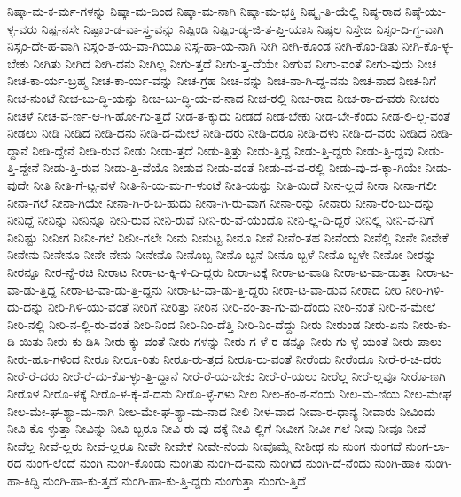 {ನಿಷ್ಕಾ-ಮ-ಕ-ರ್ಮ-ಗಳನ್ನು
ನಿಷ್ಕಾ-ಮ-ದಿಂದ
ನಿಷ್ಕಾ-ಮ-ನಾಗಿ
ನಿಷ್ಕಾ-ಮ-ಭಕ್ತಿ
ನಿಷ್ಕೃ-ತಿ-ಯೆಲ್ಲಿ
ನಿಷ್ಠ-ರಾದ
ನಿಷ್ಠೆ-ಯು-ಳ್ಳ-ವರು
ನಿಷ್ಪ-ನಸೇ
ನಿಷ್ಪಾಂ-ಡ-ವಾ-ಸ್ತ್ರ-ವನ್ನು
ನಿಷ್ಪಿಂಡಿ
ನಿಷ್ಪಿಂ-ಡ್ಯ-ಜಿ-ತ-ಪ್ತಿ-ಯಾಸಿ
ನಿಷ್ಫಲ
ನಿಸ್ತೇಜ
ನಿಸ್ಸಂ-ದಿ-ಗ್ಧ-ವಾಗಿ
ನಿಸ್ಸಂ-ದೇ-ಹ-ವಾಗಿ
ನಿಸ್ಸಂ-ಶ-ಯ-ವಾ-ಗಿಯೂ
ನಿಸ್ಸ-ಹಾ-ಯ-ನಾಗಿ
ನೀಗಿ
ನೀಗಿ-ಕೊಂಡ
ನೀಗಿ-ಕೊಂ-ಡಿತು
ನೀಗಿ-ಕೊ-ಳ್ಳ-ಬೇಕು
ನೀಗಿತು
ನೀಗಿದ
ನೀಗಿ-ದನು
ನೀಗಿಲ್ಲ
ನೀಗು-ತ್ತದೆ
ನೀಗು-ತ್ತ-ದೆಯೇ
ನೀಗುವ
ನೀಗು-ವಂತೆ
ನೀಗು-ವುದು
ನೀಚ
ನೀಚ-ಕಾ-ರ್ಯ-ಬ್ರಹ್ಮ
ನೀಚ-ಕಾ-ರ್ಯ-ವನ್ನು
ನೀಚ-ಗ್ರಹ
ನೀಚ-ನನ್ನು
ನೀಚ-ನಾ-ಗಿ-ದ್ದ-ವನು
ನೀಚ-ನಾದ
ನೀಚ-ನಿಗೆ
ನೀಚ-ನುಂಟೆ
ನೀಚ-ಬು-ದ್ಧಿ-ಯನ್ನು
ನೀಚ-ಬು-ದ್ಧಿ-ಯ-ವ-ನಾದ
ನೀಚ-ರಲ್ಲಿ
ನೀಚ-ರಾದ
ನೀಚ-ರಾ-ದ-ವರು
ನೀಚರು
ನೀಚಳೆ
ನೀಚ-ವ-ರ್ಣ-ಆ-ಗಿ-ಹೋ-ಗು-ತ್ತದೆ
ನೀಡ-ತ-ಕ್ಕುದು
ನೀಡದೆ
ನೀಡ-ಬೇಕು
ನೀಡ-ಬೇ-ಕೆಂದು
ನೀಡ-ಲಿ-ಲ್ಲ-ವಂತೆ
ನೀಡಲು
ನೀಡಿ
ನೀಡಿದ
ನೀಡಿ-ದನು
ನೀಡಿ-ದ-ಮೇಲೆ
ನೀಡಿ-ದರು
ನೀಡಿ-ದರೂ
ನೀಡಿ-ದಳು
ನೀಡಿ-ದ-ವರು
ನೀಡಿದೆ
ನೀಡಿ-ದ್ದಾನೆ
ನೀಡಿ-ದ್ದೇನೆ
ನೀಡಿ-ರುವ
ನೀಡು
ನೀಡು-ತ್ತದೆ
ನೀಡು-ತ್ತಿತ್ತು
ನೀಡು-ತ್ತಿದ್ದ
ನೀಡು-ತ್ತಿ-ದ್ದರು
ನೀಡು-ತ್ತಿ-ದ್ದವು
ನೀಡು-ತ್ತಿ-ದ್ದೇನೆ
ನೀಡು-ತ್ತಿ-ರುವ
ನೀಡು-ತ್ತಿ-ವೆಯೊ
ನೀಡುವ
ನೀಡು-ವಂತೆ
ನೀಡು-ವ-ವ-ರಲ್ಲಿ
ನೀಡು-ವು-ದ-ಕ್ಕಾ-ಗಿಯೇ
ನೀಡು-ವುದೇ
ನೀತಿ
ನೀತಿ-ಗೆ-ಟ್ಟ-ವಳೆ
ನೀತಿ-ನಿ-ಯ-ಮ-ಗ-ಳುಂಟೆ
ನೀತಿ-ಯನ್ನು
ನೀತಿ-ಯಿದೆ
ನೀನ-ಲ್ಲದೆ
ನೀನಾ
ನೀನಾ-ಗಲೀ
ನೀನಾ-ಗಲೆ
ನೀನಾ-ಗಿಯೇ
ನೀನಾ-ಗಿ-ರ-ಬ-ಹುದು
ನೀನಾ-ಗಿ-ರು-ವಾಗ
ನೀನಾ-ರನ್ನು
ನೀನಾರು
ನೀನಾ-ರೆಂ-ಬು-ದನ್ನು
ನೀನಿದ್ದೆ
ನೀನಿನ್ನು
ನೀನಿನ್ನೂ
ನೀನಿ-ರುವ
ನೀನಿ-ರುವೆ
ನೀನಿ-ರು-ವೆ-ಯೆಂದೊ
ನೀನಿ-ಲ್ಲ-ದಿ-ದ್ದರೆ
ನೀನಿಲ್ಲಿ
ನೀನಿ-ವ-ನಿಗೆ
ನೀನಿಷ್ಟು
ನೀನೀಗ
ನೀನೀ-ಗಲೆ
ನೀನೀ-ಗಲೇ
ನೀನು
ನೀನುಟ್ಟ
ನೀನೂ
ನೀನೆ
ನೀನೆಂ-ತಹ
ನೀನೆಂದು
ನೀನೆಲ್ಲಿ
ನೀನೇ
ನೀನೇಕೆ
ನೀನೇನು
ನೀನೇನೂ
ನೀನೇ-ನೇನು
ನೀನೇನೊ
ನೀನೊಬ್ಬ
ನೀನೊ-ಬ್ಬನೆ
ನೀನೊ-ಬ್ಬಳೆ
ನೀನೊ-ಬ್ಬಳೇ
ನೀನೋ
ನೀರನ್ನು
ನೀರನ್ನೂ
ನೀರ-ನ್ನೆ-ರಚಿ
ನೀರಾಟ
ನೀರಾ-ಟ-ಕ್ಕಿ-ಳಿ-ದಿ-ದ್ದರು
ನೀರಾ-ಟಕ್ಕೆ
ನೀರಾ-ಟ-ವಾಡಿ
ನೀರಾ-ಟ-ವಾ-ಡುತ್ತಾ
ನೀರಾ-ಟ-ವಾ-ಡು-ತ್ತಿದ್ದ
ನೀರಾ-ಟ-ವಾ-ಡು-ತ್ತಿ-ದ್ದನು
ನೀರಾ-ಟ-ವಾ-ಡು-ತ್ತಿ-ದ್ದರು
ನೀರಾ-ಟ-ವಾ-ಡುವ
ನೀರಾದ
ನೀರಿ
ನೀರಿ-ಗಿಳಿ-ದು-ದನ್ನು
ನೀರಿ-ಗಿಳಿ-ಯು-ವಂತೆ
ನೀರಿಗೆ
ನೀರಿತ್ತು
ನೀರಿನ
ನೀರಿ-ನಂ-ತಾ-ಗು-ವು-ದೆಂದು
ನೀರಿ-ನಂತೆ
ನೀರಿ-ನ-ಮೇಲೆ
ನೀರಿ-ನಲ್ಲಿ
ನೀರಿ-ನ-ಲ್ಲಿ-ರು-ವಂತೆ
ನೀರಿ-ನಿಂದ
ನೀರಿ-ನಿಂ-ದೆತ್ತಿ
ನೀರಿ-ನಿಂ-ದೆದ್ದು
ನೀರು
ನೀರುಂಡ
ನೀರು-ಏನು
ನೀರು-ಕು-ಡಿ-ಯಿತು
ನೀರು-ಕು-ಡಿಸಿ
ನೀರು-ಕ್ಕು-ವಂತೆ
ನೀರು-ಗಳನ್ನು
ನೀರು-ಗ-ಳೆ-ರ-ಡನ್ನೂ
ನೀರು-ಗು-ಳ್ಳೆ-ಯಂತೆ
ನೀರು-ಪಾಲು
ನೀರು-ಹೂ-ಗಳಿಂದ
ನೀರೂ
ನೀರೂ-ರಿತು
ನೀರೂ-ರು-ತ್ತದೆ
ನೀರೂ-ರು-ವಂತೆ
ನೀರೆಂದು
ನೀರೆಂದೂ
ನೀರೆ-ರ-ಚಿ-ದರು
ನೀರೆ-ರೆ-ದರು
ನೀರೆ-ರೆ-ದು-ಕೊ-ಳ್ಳು-ತ್ತಿ-ದ್ದಾನೆ
ನೀರೆ-ರೆ-ಯ-ಬೇಕು
ನೀರೆ-ರೆ-ಯಲು
ನೀರೆಲ್ಲ
ನೀರೆ-ಲ್ಲವೂ
ನೀರೊ-ಣಗಿ
ನೀರೊಳ
ನೀರೊ-ಳಕ್ಕೆ
ನೀರೊ-ಳ-ಕ್ಕೆ-ಸೆ-ದನು
ನೀರೊ-ಳ್ಳೆ-ಗಳು
ನೀಲ
ನೀಲ-ಕಂ-ಠ-ನೆಂದು
ನೀಲ-ಮ-ಣಿಯ
ನೀಲ-ಮೇಘ
ನೀಲ-ಮೇ-ಘ-ಶ್ಯಾ-ಮ-ನಾಗಿ
ನೀಲ-ಮೇ-ಘ-ಶ್ಯಾ-ಮ-ನಾದ
ನೀಲಿ
ನೀಳ-ವಾದ
ನೀವಾ-ರ-ಧಾನ್ಯ
ನೀವಾರು
ನೀವಿಂದು
ನೀವಿ-ಕೊ-ಳ್ಳುತ್ತಾ
ನೀವಿನ್ನು
ನೀವಿ-ಬ್ಬರೂ
ನೀವಿ-ರು-ವು-ದಕ್ಕೆ
ನೀವಿ-ಲ್ಲಿಗೆ
ನೀವೀಗ
ನೀವೀ-ಗಲೆ
ನೀವು
ನೀವೂ
ನೀವೆ
ನೀವೆಲ್ಲ
ನೀವೆ-ಲ್ಲರು
ನೀವೆ-ಲ್ಲರೂ
ನೀವೇ
ನೀವೇಕೆ
ನೀವೇ-ನೆಂದು
ನೀವೊಮ್ಮೆ
ನೀಶೀಥ
ನು
ನುಂಗ
ನುಂಗದೆ
ನುಂಗ-ಲಾ-ರದ
ನುಂಗ-ಲೆಂದೆ
ನುಂಗಿ
ನುಂಗಿ-ಕೊಂಡು
ನುಂಗಿತು
ನುಂಗಿ-ದ-ವನು
ನುಂಗಿದೆ
ನುಂಗಿ-ದೆ-ನೆಂದು
ನುಂಗಿ-ಹಾಕಿ
ನುಂಗಿ-ಹಾ-ಕಿದ್ದಿ
ನುಂಗಿ-ಹಾ-ಕು-ತ್ತದೆ
ನುಂಗಿ-ಹಾ-ಕು-ತ್ತಿ-ದ್ದರು
ನುಂಗುತ್ತಾ
ನುಂಗು-ತ್ತಿದೆ
}
